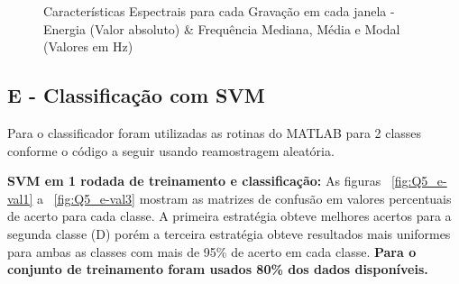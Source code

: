 \documentclass{article}
\begin{document}
\begin{figure}[H]
\qquad
{}
\qquad
{}
\caption{Características Espectrais para cada Gravação em cada janela - Energia (Valor absoluto) \& Frequência Mediana, Média e Modal (Valores em Hz)}
\label{fig:Q5_dFF}
\end{figure}

\subsection*{E - Classificação com SVM}
Para o classificador foram utilizadas as rotinas do MATLAB para 2 classes conforme o código a seguir usando reamostragem aleatória.


\textbf{SVM em 1 rodada de treinamento e classificação:} As figuras ~\ref{fig:Q5_e-val1} a ~\ref{fig:Q5_e-val3} mostram as matrizes de confusão em valores percentuais de acerto para cada classe. A primeira estratégia obteve melhores acertos para a segunda classe (D) porém a terceira estratégia obteve resultados mais uniformes para ambas as classes com mais de 95\% de acerto em cada classe. \textbf{Para o conjunto de treinamento foram usados 80\% dos dados disponíveis.}
\end{document}
